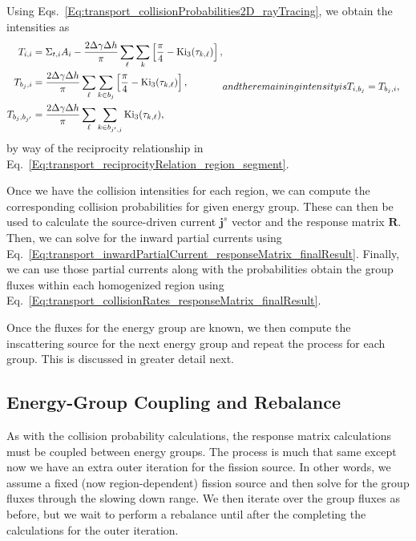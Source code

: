 Using Eqs.~\eqref{Eq:transport_collisionProbabilities2D_rayTracing}, we obtain the intensities as
\begin{subequations}
\begin{align}
  T_{i,i} &= \Sigma_{t,i} A_i - \frac{ 2 \Delta\gamma \Delta h }{ \pi } \sum_\ell \sum_k \left[ \frac{\pi}{4} - \kin_3( \tau_{k,\ell} ) \right] , \\
  T_{b_{j},i} &= \frac{ 2 \Delta\gamma \Delta h }{ \pi } \sum_\ell \sum_{ k \in b_j } \left[ \frac{\pi}{4} - \kin_3( \tau_{k,\ell} ) \right] , \\
  T_{b_{j},b_{j'}} &= \frac{ 2 \Delta\gamma \Delta h }{ \pi } \sum_\ell \sum_{ k \in b_{j',j} } \kin_3( \tau_{k,\ell} ) ,
\end{align}
and the remaining intensity is
\begin{align}
  T_{i,b_{j}} &= T_{b_{j},i} ,
\end{align}
\end{subequations}
by way of the reciprocity relationship in Eq.~\eqref{Eq:transport_reciprocityRelation_region_segment}.

Once we have the collision intensities for each region, we can compute the corresponding collision probabilities for given energy group. These can then be used to calculate the source-driven current $\mathbf{j}^s$ vector and the response matrix $\mathbf{R}$. Then, we can solve for the inward partial currents using Eq.~\eqref{Eq:transport_inwardPartialCurrent_responseMatrix_finalResult}. Finally, we can use those partial currents along with the probabilities obtain the group fluxes within each homogenized region using Eq.~\eqref{Eq:transport_collisionRates_responseMatrix_finalResult}.

Once the fluxes for the energy group are known, we then compute the inscattering source for the next energy group and repeat the process for each group. This is discussed in greater detail next.

\subsection{Energy-Group Coupling and Rebalance}

As with the collision probability calculations, the response matrix calculations must be coupled between energy groups. The process is much that same except now we have an extra outer iteration for the fission source. In other words, we assume a fixed (now region-dependent) fission source and then solve for the group fluxes through the slowing down range. We then iterate over the group fluxes as before, but we wait to perform a rebalance until after the completing the calculations for the outer iteration. 

